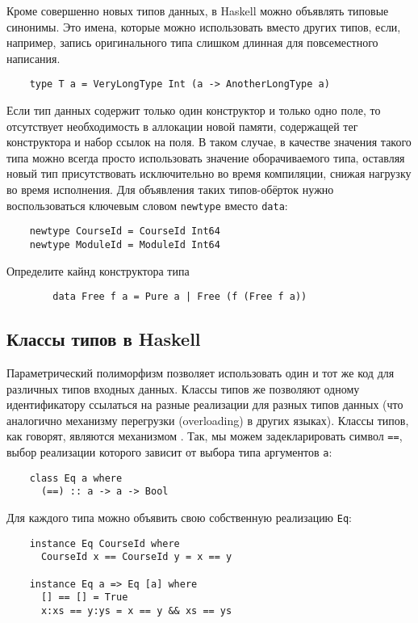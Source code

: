 Кроме совершенно новых типов данных, в Haskell можно объявлять типовые синонимы.
Это имена, которые можно использовать вместо других типов, если, например, запись оригинального типа слишком длинная для повсеместного написания.
\begin{verbatim}
    type T a = VeryLongType Int (a -> AnotherLongType a)
\end{verbatim}

Если тип данных содержит только один конструктор и только одно поле, то отсутствует необходимость в аллокации новой памяти, содержащей тег конструктора и набор ссылок на поля.
В таком случае, в качестве значения такого типа можно всегда просто использовать значение оборачиваемого типа, оставляя новый тип присутствовать исключительно во время компиляции, снижая нагрузку во время исполнения.
Для объявления таких типов-обёрток нужно воспользоваться ключевым словом \texttt{newtype} вместо \texttt{data}:
\begin{verbatim}
    newtype CourseId = CourseId Int64
    newtype ModuleId = ModuleId Int64
\end{verbatim}

\begin{task}
    Определите кайнд конструктора типа
    \begin{verbatim}
        data Free f a = Pure a | Free (f (Free f a))
    \end{verbatim}
\end{task}

\subsection{Классы типов в Haskell}

Параметрический полиморфизм позволяет использовать один и тот же код для различных типов входных данных.
Классы типов же позволяют одному идентификатору ссылаться на разные реализации для разных типов данных (что аналогично механизму перегрузки (overloading) в других языках).
Классы типов, как говорят, являются механизмом .
Так, мы можем задекларировать символ \texttt{==}, выбор реализации которого зависит от выбора типа аргументов \texttt{a}:
\begin{verbatim}
    class Eq a where
      (==) :: a -> a -> Bool
\end{verbatim}

Для каждого типа можно объявить свою собственную реализацию \texttt{Eq}:
\begin{verbatim}
    instance Eq CourseId where
      CourseId x == CourseId y = x == y

    instance Eq a => Eq [a] where
      [] == [] = True
      x:xs == y:ys = x == y && xs == ys
\end{verbatim}


